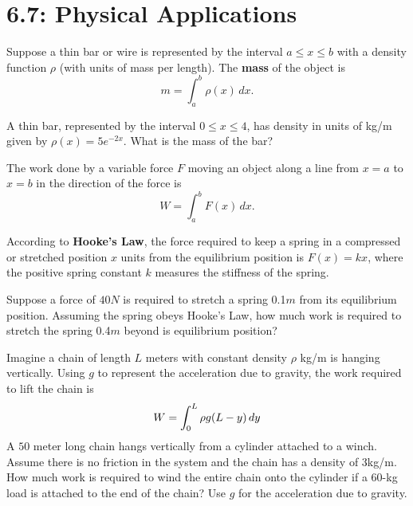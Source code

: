 \documentclass[../mathNotesPreamble]{subfiles}
\begin{document}
  \section{6.7: Physical Applications}

  \begin{defn*}
    Suppose a thin bar or wire is represented by the interval $a\leq x\leq b$ with a density function $\rho$ (with units of mass per length). The \textbf{mass} of the object is
      \[m=\int_a^b \rho(x)\,dx.\]
  \end{defn*}

  \begin{ex*}
    A thin bar, represented by the interval $0\leq x\leq 4$, has density in units of kg/m given by $\rho(x)=5e^{-2x}$. What is the mass of the bar?
  \end{ex*}
  \pagebreak

  \begin{defn*}[Work]
    The work done by a variable force $F$ moving an object along a line from $x=a$ to $x=b$ in the direction of the force is
      \[W=\int_a^b F(x)\,dx.\]
  \end{defn*}

  \begin{ex*}
    According to \textbf{Hooke's Law}, the force required to keep a spring in a compressed or stretched position $x$ units from the equilibrium position is $F(x)=kx$, where the positive spring constant $k$ measures the stiffness of the spring.
    \vspace*{\baselineskip}

    Suppose a force of $40 N$ is required to stretch a spring 0.1$m$ from its equilibrium position. Assuming the spring obeys Hooke's Law, how much work is required to stretch the spring 0.4$m$ beyond is equilibrium position? 
  \end{ex*}
  \pagebreak

  \begin{ex*}
    Imagine a chain of length $L$ meters with constant density $\rho$ kg/m is hanging vertically. Using $g$ to represent the acceleration due to gravity, the work required to lift the chain is
      \[W=\int_0^L \rho g{\left(L-y\right)}\,dy\]
    A $50$ meter long chain hangs vertically from a cylinder attached to a winch. Assume there is no friction in the system and the chain has a density of $3$\nobreakspace kg/m. How much work is required to wind the entire chain onto the cylinder if a $60$-kg load is attached to the end of the chain? Use $g$ for the acceleration due to gravity.
  \end{ex*}
  \pagebreak
\end{document}
